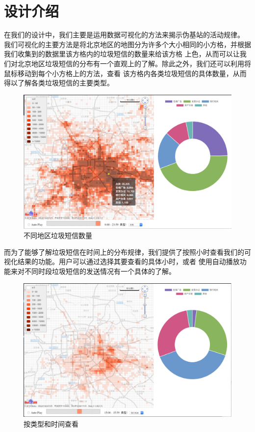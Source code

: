 \documentclass[12pt,a4paper]{article}
\begin{document}
\section{设计介绍}

在我们的设计中，我们主要是运用数据可视化的方法来揭示伪基站的活动规律。
我们可视化的主要方法是将北京地区的地图分为许多个大小相同的小方格，并根据我们收集到的数据里该方格内的垃圾短信的数量来给该方格
上色，从而可以让我们对北京地区垃圾短信的分布有一个直观上的了解。除此之外，我们还可以利用将鼠标移动到每个小方格上的方法，查看
该方格内各类垃圾短信的具体数量，从而得以了解各类垃圾短信的主要类型。



\begin{flushleft}
\begin{figure}[H]
	\centering
		\includegraphics[width=\linewidth]{pic1.png}
		\caption{不同地区垃圾短信数量}
\end{figure}
\end{flushleft}
	

而为了能够了解垃圾短信在时间上的分布规律，我们提供了按照小时查看我们的可视化结果的功能。用户可以通过选择其要查看的具体小时，或者
使用自动播放功能来对不同时段垃圾短信的发送情况有一个具体的了解。

\begin{flushleft}
	\begin{figure}[H]
		\centering
			\includegraphics[width=\linewidth]{pic3.png}
			\caption{按类型和时间查看}
	\end{figure}
\end{flushleft}
\end{document}
